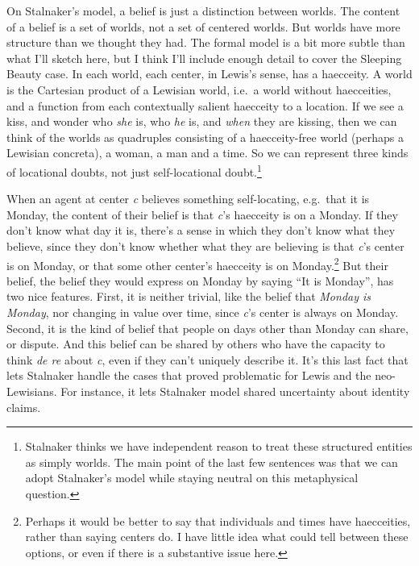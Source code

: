 \documentclass[
  10pt,
  letterpaper,
  DIV=11,
  numbers=noendperiod,
  twoside]{scrartcl}
\begin{document}
On Stalnaker's model, a belief is just a distinction between worlds. The
content of a belief is a set of worlds, not a set of centered worlds.
But worlds have more structure than we thought they had. The formal
model is a bit more subtle than what I'll sketch here, but I think I'll
include enough detail to cover the Sleeping Beauty case. In each world,
each center, in Lewis's sense, has a haecceity. A world is the Cartesian
product of a Lewisian world, i.e.~a world without haecceities, and a
function from each contextually salient haecceity to a location. If we
see a kiss, and wonder who \emph{she} is, who \emph{he} is, and
\emph{when} they are kissing, then we can think of the worlds as
quadruples consisting of a haecceity-free world (perhaps a Lewisian
concreta), a woman, a man and a time. So we can represent three kinds of
locational doubts, not just self-locational doubt.\footnote{Stalnaker
  thinks we have independent reason to treat these structured entities
  as simply worlds. The main point of the last few sentences was that we
  can adopt Stalnaker's model while staying neutral on this metaphysical
  question.}

When an agent at center \emph{c} believes something self-locating,
e.g.~that it is Monday, the content of their belief is that \emph{c}'s
haecceity is on a Monday. If they don't know what day it is, there's a
sense in which they don't know what they believe, since they don't know
whether what they are believing is that \emph{c}'s center is on Monday,
or that some other center's haecceity is on Monday.\footnote{Perhaps it
  would be better to say that individuals and times have haecceities,
  rather than saying centers do. I have little idea what could tell
  between these options, or even if there is a substantive issue here.}
But their belief, the belief they would express on Monday by saying ``It
is Monday'', has two nice features. First, it is neither trivial, like
the belief that \emph{Monday is Monday}, nor changing in value over
time, since \emph{c}'s center is always on Monday. Second, it is the
kind of belief that people on days other than Monday can share, or
dispute. And this belief can be shared by others who have the capacity
to think \emph{de re} about \emph{c}, even if they can't uniquely
describe it. It's this last fact that lets Stalnaker handle the cases
that proved problematic for Lewis and the neo-Lewisians. For instance,
it lets Stalnaker model shared uncertainty about identity claims.
\end{document}
